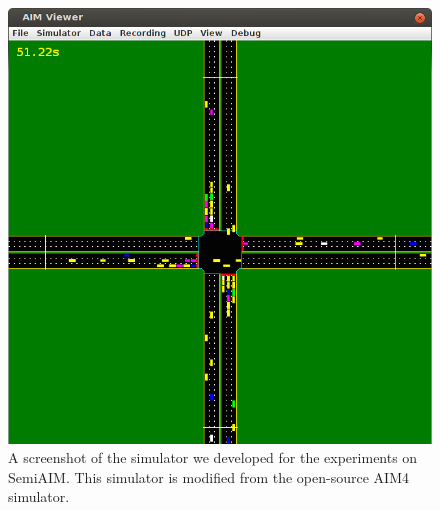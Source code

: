 % 

\begin{figure}
\centering
\includegraphics[width=0.55\columnwidth]{figures/demo.png}
\vspace{-.1in}
\caption{A screenshot of the simulator we developed for the experiments on
SemiAIM. This simulator is modified from the open-source AIM4 simulator.}
\label{fig:simulator}
\vspace{-.3in}
\end{figure}














